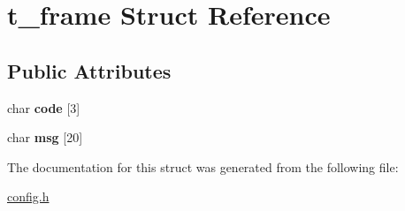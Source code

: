 \hypertarget{structt__frame}{}\section{t\+\_\+frame Struct Reference}
\label{structt__frame}
\subsection*{Public Attributes}
\begin{DoxyCompactItemize}
\item 
\mbox{\label{structt__frame_a69c5abed226d1fb782ac8c922c778767}} 
char {\bfseries code} \mbox{[}3\mbox{]}
\item 
\mbox{\label{structt__frame_a57f62f9436b3384b5e6a226a086a5ef3}} 
char {\bfseries msg} \mbox{[}20\mbox{]}
\end{DoxyCompactItemize}


The documentation for this struct was generated from the following file\+:\begin{DoxyCompactItemize}
\item 
\mbox{\hyperlink{config_8h}{config.\+h}}\end{DoxyCompactItemize}

